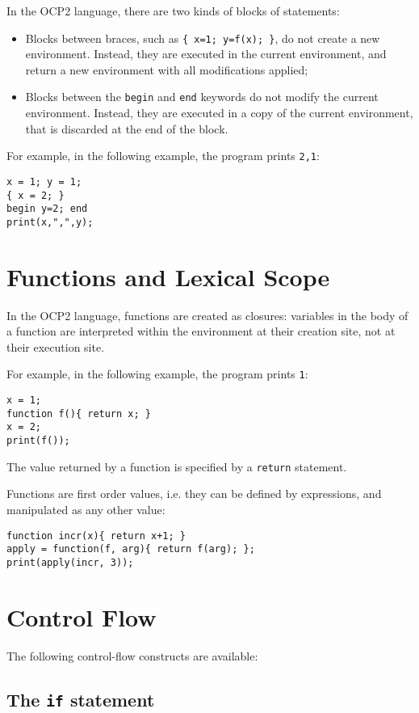 In the OCP2 language, there are two kinds of blocks of statements:
\begin{itemize}
\item Blocks between braces, such as \verb+{ x=1; y=f(x); }+, do not
  create a new environment. Instead, they are executed in the current
  environment, and return a new environment with all modifications
  applied;
\item Blocks between the \verb+begin+ and \verb+end+ keywords do not
  modify the current environment. Instead, they are executed in a copy
  of the current environment, that is discarded at the end of the
  block.
\end{itemize}

For example, in the following example, the program prints \verb+2,1+:
\begin{verbatim}
x = 1; y = 1;
{ x = 2; }
begin y=2; end
print(x,",",y);
\end{verbatim}

\section{Functions and Lexical Scope}

In the OCP2 language, functions are created as closures: variables
in the body of a function are interpreted within the environment
at their creation site, not at their execution site.

For example, in the following example, the program prints \verb+1+:
\begin{verbatim}
x = 1;
function f(){ return x; }
x = 2;
print(f());
\end{verbatim}

The value returned by a function is specified by a {\tt return} statement.

Functions are first order values, i.e. they can be defined by expressions,
and manipulated as any other value:
\begin{verbatim}
function incr(x){ return x+1; }
apply = function(f, arg){ return f(arg); };
print(apply(incr, 3));
\end{verbatim}



\section{Control Flow}

The following control-flow constructs are available:

\subsection{The {\tt if} statement}

